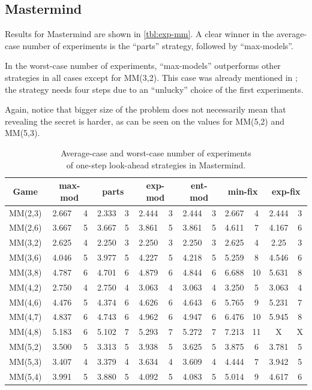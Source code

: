 \subsection{Mastermind}

Results for Mastermind are shown in \autoref{tbl:exp-mm}.
A clear winner in the average-case number of experiments is the ``parts'' strategy,
followed by ``max-models''.

In the worst-case number of experiments, ``max-models'' outperforms other
  strategies in all cases except for MM(3,2).
This case was already mentioned in ;
the strategy needs four steps due to an ``unlucky'' choice of the first experiments.

Again, notice that bigger size of the problem does not necessarily mean that
  revealing the secret is harder, as can be seen on the values for MM(5,2) and MM(5,3).

\begin{table}[h]
\begin{center}
\begin{tabular}{|c|c|c|c|c|c|c|c|c|c|c|c|c|}\hline
Game & \multicolumn{2}{c}{max-mod} & \multicolumn{2}{c}{parts}
& \multicolumn{2}{c}{exp-mod} & \multicolumn{2}{c}{ent-mod}
& \multicolumn{2}{c}{min-fix} & \multicolumn{2}{c}{exp-fix}\\ \hline
MM(2,3) & 2.667 & 4 & 2.333 & 3 & 2.444 & 3 & 2.444 & 3 & 2.667 & 4 & 2.444 & 3 \\
MM(2,6) & 3.667 & 5 & 3.667 & 5 & 3.861 & 5 & 3.861 & 5 & 4.611 & 7 & 4.167 & 6 \\\hline
MM(3,2) & 2.625 & 4 & 2.250 & 3 & 2.250 & 3 & 2.250 & 3 & 2.625 & 4 & 2.25 &  3 \\
MM(3,6) & 4.046 & 5 & 3.977 & 5 & 4.227 & 5 & 4.218 & 5 & 5.259 & 8 & 4.546 & 6 \\
MM(3,8) & 4.787 & 6 & 4.701 & 6 & 4.879 & 6 & 4.844 & 6 & 6.688 & 10 & 5.631 & 8 \\\hline
MM(4,2) & 2.750 & 4 & 2.750 & 4 & 3.063 & 4 & 3.063 & 4 & 3.250 & 5 & 3.063 & 4 \\
MM(4,6) & 4.476 & 5 & 4.374 & 6 & 4.626 & 6 & 4.643 & 6 & 5.765 & 9 & 5.231 & 7 \\
MM(4,7) & 4.837 & 6 & 4.743 & 6 & 4.962 & 6 & 4.947 & 6 & 6.476 & 10 & 5.945 & 8 \\
MM(4,8) & 5.183 & 6 & 5.102 & 7 & 5.293 & 7 & 5.272 & 7 & 7.213 & 11 & X & X \\\hline
MM(5,2) & 3.500 & 5 & 3.313 & 5 & 3.938 & 5 & 3.625 & 5 & 3.875 & 6 & 3.781 & 5 \\
MM(5,3) & 3.407 & 4 & 3.379 & 4 & 3.634 & 4 & 3.609 & 4 & 4.444 & 7 & 3.942 & 5 \\
MM(5,4) & 3.991 & 5 & 3.880 & 5 & 4.092 & 5 & 4.083 & 5 & 5.014 & 9 & 4.617 & 6 \\\hline
\end{tabular}
\caption{Average-case and worst-case number of experiments\\
  of one-step look-ahead strategies in Mastermind.}
\label{tbl:exp-mm}
\end{center}
\end{table}


